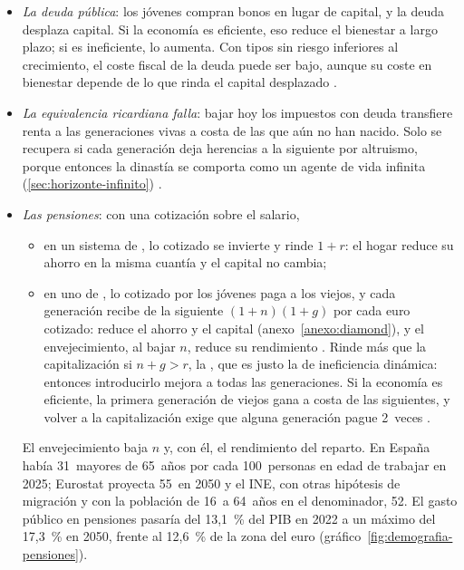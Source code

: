 \documentclass[11pt]{article}
\begin{document}
\begin{itemize}
\item \emph{La deuda pública}: los jóvenes compran bonos en lugar de capital, y la deuda desplaza capital\nocite{Diamond1965National}. Si la economía es eficiente, eso reduce el bienestar a largo plazo; si es ineficiente, lo aumenta. Con tipos sin riesgo inferiores al crecimiento, el coste fiscal de la deuda puede ser bajo, aunque su coste en bienestar depende de lo que rinda el capital desplazado\nocite{Blanchard2019Deuda} .
\item \emph{La equivalencia ricardiana falla}: bajar hoy los impuestos con deuda transfiere renta a las generaciones vivas a costa de las que aún no han nacido. Solo se recupera si cada generación deja herencias a la siguiente por altruismo, porque entonces la dinastía se comporta como un agente de vida infinita (\ref{sec:horizonte-infinito})\nocite{Barro1974} .
\item \emph{Las pensiones}: con una cotización sobre el salario,
  \begin{itemize}
  \item en un sistema de , lo cotizado se invierte y rinde $1+r$: el hogar reduce su ahorro en la misma cuantía y el capital no cambia;
  \item en uno de , lo cotizado por los jóvenes paga a los viejos, y cada generación recibe de la siguiente $(1+n)(1+g)$ por cada euro cotizado: reduce el ahorro y el capital (anexo~\ref{anexo:diamond}), y el envejecimiento, al bajar $n$, reduce su rendimiento . Rinde más que la capitalización si $n+g>r$, la \nocite{Aaron1966Social}, que es justo la de ineficiencia dinámica: entonces introducirlo mejora a todas las generaciones. Si la economía es eficiente, la primera generación de viejos gana a costa de las siguientes, y volver a la capitalización exige que alguna generación pague 2~veces  .
  \end{itemize}
  El envejecimiento baja $n$ y, con él, el rendimiento del reparto. En España había 31~mayores de 65~años por cada 100~personas en edad de trabajar en 2025; Eurostat proyecta 55~en 2050\nocite{Eurostat2026Dependencia,Eurostat2026EUROPOP2025} y el INE, con otras hipótesis de migración y con la población de 16~a 64~años en el denominador, 52\nocite{INE2026Proyecciones}. El gasto público en pensiones pasaría del 13,1~\% del PIB en 2022 a un máximo del 17,3~\% en 2050, frente al 12,6~\% de la zona del euro\nocite{CE2024AgeingReport} (gráfico~\ref{fig:demografia-pensiones}).

\end{itemize}
\end{document}
